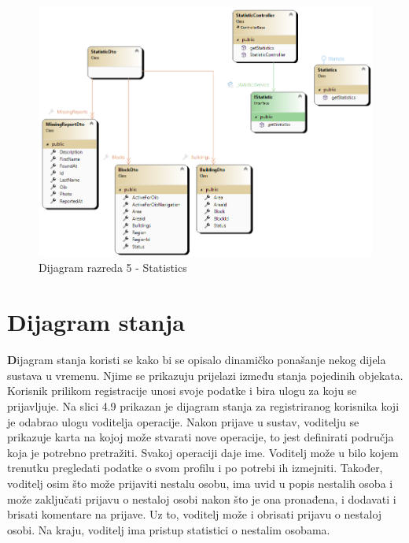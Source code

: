 			\begin{figure}[h!] \includegraphics[width=\linewidth]{dijagrami/CD-Statistics.png}
				\caption{Dijagram razreda 5 - Statistics}
			\end{figure}
					
			\eject
		
		\section{Dijagram stanja}
			
			
			
			
			\textbf Dijagram stanja koristi se kako bi se opisalo dinamičko ponašanje nekog dijela sustava u vremenu. Njime se prikazuju prijelazi između stanja pojedinih objekata. Korisnik prilikom registracije unosi svoje podatke i bira ulogu za koju se prijavljuje. Na slici 4.9 prikazan je dijagram stanja za registriranog korisnika koji je odabrao ulogu voditelja operacije. Nakon prijave u sustav, voditelju se prikazuje karta na kojoj može stvarati nove operacije, to jest definirati područja koja je potrebno pretražiti. Svakoj operaciji daje ime. Voditelj može u bilo kojem trenutku pregledati podatke o svom profilu i po potrebi ih izmejniti. Također, voditelj osim što može prijaviti nestalu osobu, ima uvid u popis nestalih osoba i može zaključati prijavu o nestaloj osobi nakon što je ona pronađena, i dodavati i brisati komentare na prijave. Uz to, voditelj može i obrisati prijavu o nestaloj osobi. Na kraju, voditelj ima pristup statistici o nestalim osobama.   
			
